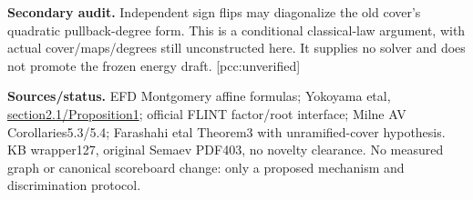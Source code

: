 \documentclass[10pt]{article}
\begin{document}
\textbf{Secondary audit.} Independent sign flips may diagonalize the old
cover's quadratic pullback-degree form. This is a conditional classical-law
argument, with actual cover/maps/degrees still unconstructed here. It supplies
no solver and does not promote the frozen energy draft. [pcc:unverified]

\textbf{Sources/status.} EFD Montgomery affine formulas; Yokoyama etal,
\href{https://nutmic2019.imj-prg.fr/confpapers/SemaevECDLP.pdf}{section2.1/Proposition1};
official FLINT factor/root interface; Milne AV Corollaries5.3/5.4;
Farashahi etal Theorem3 with unramified-cover hypothesis. KB wrapper127,
original Semaev PDF403, no novelty clearance. No measured graph or canonical
scoreboard change: only a proposed mechanism and discrimination protocol.
\end{document}
